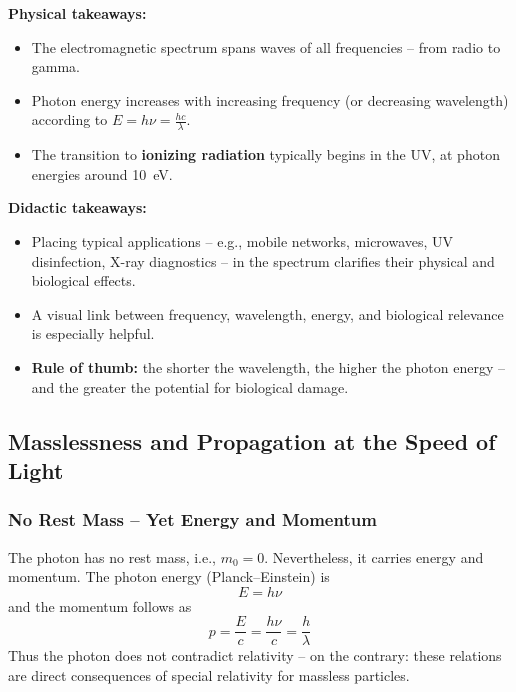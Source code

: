 \begin{tcolorbox}[hinweisbox,title=Takeaways on the Electromagnetic Spectrum]
	\label{box:Fazit zum elektro}
	\textbf{Physical takeaways:}
	\begin{itemize}
		\item The electromagnetic spectrum spans waves of all frequencies – from radio to gamma.
		\item Photon energy increases with increasing frequency (or decreasing wavelength) according to \(E = h \nu = \tfrac{hc}{\lambda}\).
		\item The transition to \textbf{ionizing radiation} typically begins in the UV, at photon energies around \SI{10}{\electronvolt}.
	\end{itemize}
	\vspace{0.5em}
	\textbf{Didactic takeaways:}
	\begin{itemize}
		\item Placing typical applications – e.g., mobile networks, microwaves, UV disinfection, X-ray diagnostics – in the spectrum clarifies their physical and biological effects.
		\item A visual link between frequency, wavelength, energy, and biological relevance is especially helpful.
		\item \textbf{Rule of thumb:} the shorter the wavelength, the higher the photon energy – and the greater the potential for biological damage.
	\end{itemize}
\end{tcolorbox}
\newpage
\noindent

\subsection{Masslessness and Propagation at the Speed of Light}

\subsubsection{No Rest Mass – Yet Energy and Momentum}

The photon has no rest mass, i.e., $m_0 = 0$. Nevertheless, it carries energy and momentum. The photon energy (Planck–Einstein) is
$$
E = h \nu
$$
and the momentum follows as
$$
p = \frac{E}{c} = \frac{h\nu}{c} = \frac{h}{\lambda}
$$
Thus the photon does not contradict relativity – on the contrary: these relations are direct consequences of special relativity for massless particles.

